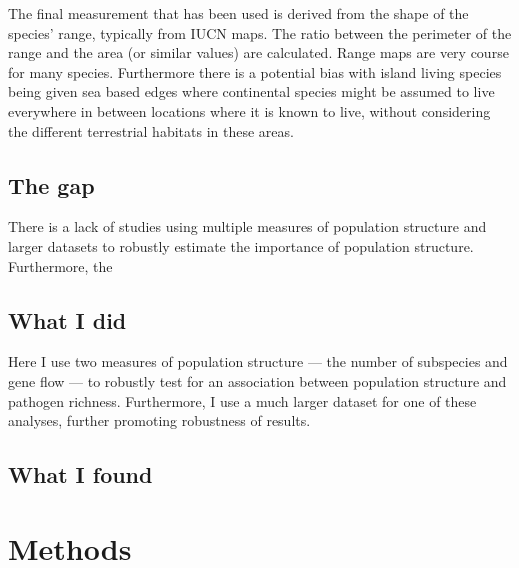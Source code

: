 
The final measurement that has been used is derived from the shape of the species' range, typically from IUCN \cite{iucn} maps.
The ratio between the perimeter of the range and the area (or similar values) are calculated.
Range maps are very course for many species.
Furthermore there is a potential bias with island living species being given sea based edges where continental species might be assumed to live everywhere in between locations where it is known to live, without considering the different terrestrial habitats in these areas.

\subsection{The gap}

There is a lack of studies using multiple measures of population structure and larger datasets to robustly estimate the importance of population structure.
Furthermore, the

\subsection{What I did}

Here I use two measures of population structure --- the number of subspecies and gene flow --- to robustly test for an association between population structure and pathogen richness.
Furthermore, I use a much larger dataset for one of these analyses, further promoting robustness of results.

\subsection{What I found}





\section{Methods}

